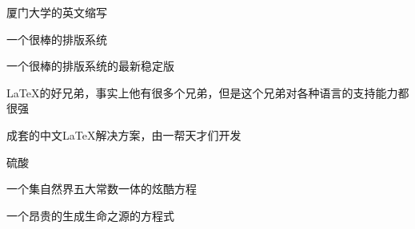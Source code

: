 \begin{notations}
\item[XMU] 厦门大学的英文缩写
\item[\LaTeX] 一个很棒的排版系统
\item[\LaTeXe] 一个很棒的排版系统的最新稳定版
\item[\XeTeX] \LaTeX{}的好兄弟，事实上他有很多个兄弟，但是这个兄弟对各种语言的支持能力都很强
\item[ctex] 成套的中文\LaTeX{}解决方案，由一帮天才们开发
\item[\ce{H2SO4}] 硫酸
\item[$ e^{\pi{}i}+1=0$] 一个集自然界五大常数一体的炫酷方程
\item[\ce{2H2 + O2 -> 2H2O}] 一个昂贵的生成生命之源的方程式
\end{notations}

